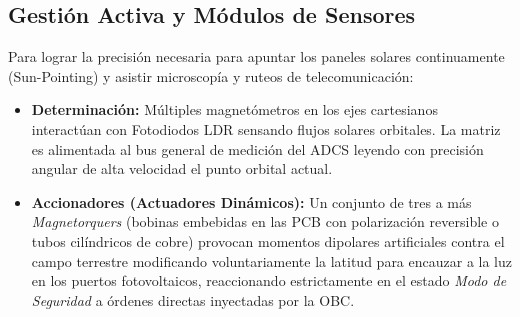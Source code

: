 \subsection{Gestión Activa y Módulos de Sensores}
Para lograr la precisión necesaria para apuntar los paneles solares continuamente (Sun-Pointing) y asistir microscopía y ruteos de telecomunicación:
\begin{itemize}
    \item \textbf{Determinación:} Múltiples magnetómetros en los ejes cartesianos interactúan con Fotodiodos LDR sensando flujos solares orbitales. La matriz es alimentada al bus general de medición del ADCS leyendo con precisión angular de alta velocidad el punto orbital actual.
    \item \textbf{Accionadores (Actuadores Dinámicos):} Un conjunto de tres a más \textit{Magnetorquers} (bobinas embebidas en las PCB con polarización reversible o tubos cilíndricos de cobre) provocan momentos dipolares artificiales contra el campo terrestre modificando voluntariamente la latitud para encauzar a la luz en los puertos fotovoltaicos, reaccionando estrictamente en el estado \textit{Modo de Seguridad} a órdenes directas inyectadas por la OBC.
\end{itemize}
